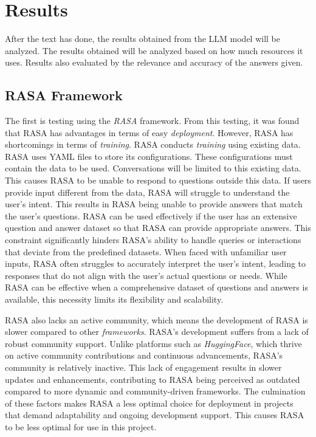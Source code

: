 \section{Results}
\label{sec:analisahasil}

After the text has done, the results obtained from the LLM model will be analyzed. The results obtained will be analyzed based on how much resources it uses. Results also evaluated by the relevance and accuracy of the answers given. 

\subsection{RASA Framework}
The first is testing using the \emph{RASA} framework. From this testing, it was found that RASA has advantages in terms of easy \emph{deployment}. However, RASA has shortcomings in terms of \emph{training}. RASA conducts \emph{training} using existing data. RASA uses YAML files to store its configurations. These configurations must contain the data to be used. Conversations will be limited to this existing data. This causes RASA to be unable to respond to questions outside this data. If users provide input different from the data, RASA will struggle to understand the user's intent. This results in RASA being unable to provide answers that match the user's questions. RASA can be used effectively if the user has an extensive question and answer dataset so that RASA can provide appropriate answers. This constraint significantly hinders RASA’s ability to handle queries or interactions that deviate from the predefined datasets. When faced with unfamiliar user inputs, RASA often struggles to accurately interpret the user's intent, leading to responses that do not align with the user's actual questions or needs. While RASA can be effective when a comprehensive dataset of questions and answers is available, this necessity limits its flexibility and scalability.

RASA also lacks an active community, which means the development of RASA is slower compared to other \emph{frameworks}. RASA’s development suffers from a lack of robust community support. Unlike platforms such as \emph{HuggingFace}, which thrive on active community contributions and continuous advancements, RASA's community is relatively inactive. This lack of engagement results in slower updates and enhancements, contributing to RASA being perceived as outdated compared to more dynamic and community-driven frameworks. The culmination of these factors makes RASA a less optimal choice for deployment in projects that demand adaptability and ongoing development support. This causes RASA to be less optimal for use in this project.


